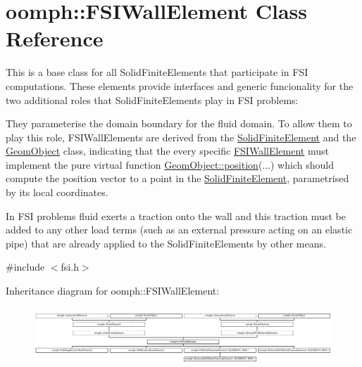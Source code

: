 \hypertarget{classoomph_1_1FSIWallElement}{}\section{oomph\+:\+:F\+S\+I\+Wall\+Element Class Reference}
\label{classoomph_1_1FSIWallElement}


This is a base class for all Solid\+Finite\+Elements that participate in F\+SI computations. These elements provide interfaces and generic funcionality for the two additional roles that Solid\+Finite\+Elements play in F\+SI problems\+:
\begin{DoxyEnumerate}
\item They parameterise the domain boundary for the fluid domain. To allow them to play this role, F\+S\+I\+Wall\+Elements are derived from the \hyperlink{classoomph_1_1SolidFiniteElement}{Solid\+Finite\+Element} and the \hyperlink{classoomph_1_1GeomObject}{Geom\+Object} class, indicating that the every specific \hyperlink{classoomph_1_1FSIWallElement}{F\+S\+I\+Wall\+Element} must implement the pure virtual function \hyperlink{classoomph_1_1GeomObject_a0d04c9d4667817f3ef24bb660fd56065}{Geom\+Object\+::position}(...) which should compute the position vector to a point in the \hyperlink{classoomph_1_1SolidFiniteElement}{Solid\+Finite\+Element}, parametrised by its local coordinates.
\item In F\+SI problems fluid exerts a traction onto the wall and this traction must be added to any other load terms (such as an external pressure acting on an elastic pipe) that are already applied to the Solid\+Finite\+Elements by other means.
\end{DoxyEnumerate} 




{\ttfamily \#include $<$fsi.\+h$>$}

Inheritance diagram for oomph\+:\+:F\+S\+I\+Wall\+Element\+:\begin{figure}[H]
\begin{center}
\leavevmode
\includegraphics[height=2.245989cm]{classoomph_1_1FSIWallElement}
\end{center}
\end{figure}

